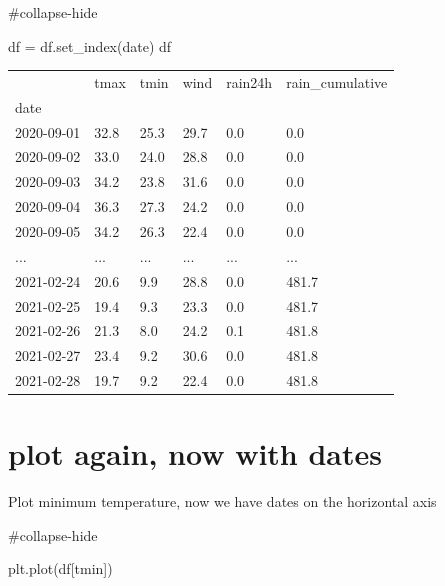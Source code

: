 \documentclass[
  letterpaper,
  DIV=11,
  numbers=noendperiod]{scrreprt}
\newenvironment{Shaded}{\begin{snugshade}}{\end{snugshade}}
\newcommand{\CommentTok}[1]{\textcolor[rgb]{0.37,0.37,0.37}{#1}}
\newcommand{\NormalTok}[1]{\textcolor[rgb]{0.00,0.23,0.31}{#1}}
\newcommand{\OperatorTok}[1]{\textcolor[rgb]{0.37,0.37,0.37}{#1}}
\newcommand{\StringTok}[1]{\textcolor[rgb]{0.13,0.47,0.30}{#1}}
\begin{document}
\begin{Shaded}
\begin{Highlighting}[]
\CommentTok{\#collapse{-}hide}

\NormalTok{df }\OperatorTok{=}\NormalTok{ df.set\_index(}\StringTok{\textquotesingle{}date\textquotesingle{}}\NormalTok{)}
\NormalTok{df}
\end{Highlighting}
\end{Shaded}

\begin{longtable}[]{@{}llllll@{}}
\toprule()
& tmax & tmin & wind & rain24h & rain\_cumulative \\
date & & & & & \\
\midrule()
\endhead
2020-09-01 & 32.8 & 25.3 & 29.7 & 0.0 & 0.0 \\
2020-09-02 & 33.0 & 24.0 & 28.8 & 0.0 & 0.0 \\
2020-09-03 & 34.2 & 23.8 & 31.6 & 0.0 & 0.0 \\
2020-09-04 & 36.3 & 27.3 & 24.2 & 0.0 & 0.0 \\
2020-09-05 & 34.2 & 26.3 & 22.4 & 0.0 & 0.0 \\
... & ... & ... & ... & ... & ... \\
2021-02-24 & 20.6 & 9.9 & 28.8 & 0.0 & 481.7 \\
2021-02-25 & 19.4 & 9.3 & 23.3 & 0.0 & 481.7 \\
2021-02-26 & 21.3 & 8.0 & 24.2 & 0.1 & 481.8 \\
2021-02-27 & 23.4 & 9.2 & 30.6 & 0.0 & 481.8 \\
2021-02-28 & 19.7 & 9.2 & 22.4 & 0.0 & 481.8 \\
\bottomrule()
\end{longtable}

\hypertarget{plot-again-now-with-dates}{%
\section{plot again, now with dates}\label{plot-again-now-with-dates}}

Plot minimum temperature, now we have dates on the horizontal axis

\begin{Shaded}
\begin{Highlighting}[]
\CommentTok{\#collapse{-}hide}

\NormalTok{plt.plot(df[}\StringTok{\textquotesingle{}tmin\textquotesingle{}}\NormalTok{])}
\end{Highlighting}
\end{Shaded}
\end{document}
